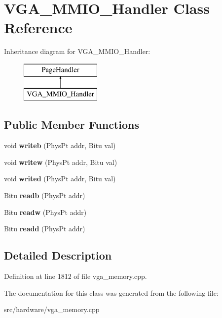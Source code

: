 \hypertarget{classVGA__MMIO__Handler}{\section{V\-G\-A\-\_\-\-M\-M\-I\-O\-\_\-\-Handler Class Reference}
\label{classVGA__MMIO__Handler}
}
Inheritance diagram for V\-G\-A\-\_\-\-M\-M\-I\-O\-\_\-\-Handler\-:\begin{figure}[H]
\begin{center}
\leavevmode
\includegraphics[height=2.000000cm]{classVGA__MMIO__Handler}
\end{center}
\end{figure}
\subsection*{Public Member Functions}
\begin{DoxyCompactItemize}
\item 
\hypertarget{classVGA__MMIO__Handler_a779662658a576ce1bd9aa3179e424495}{void {\bfseries writeb} (Phys\-Pt addr, Bitu val)}\label{classVGA__MMIO__Handler_a779662658a576ce1bd9aa3179e424495}

\item 
\hypertarget{classVGA__MMIO__Handler_a25ce81cdbb53959e45187ab1ac650cb2}{void {\bfseries writew} (Phys\-Pt addr, Bitu val)}\label{classVGA__MMIO__Handler_a25ce81cdbb53959e45187ab1ac650cb2}

\item 
\hypertarget{classVGA__MMIO__Handler_a60397669cf87d269153e5d1554cc16c4}{void {\bfseries writed} (Phys\-Pt addr, Bitu val)}\label{classVGA__MMIO__Handler_a60397669cf87d269153e5d1554cc16c4}

\item 
\hypertarget{classVGA__MMIO__Handler_aefab83f4a14d5626418aa371839e426f}{Bitu {\bfseries readb} (Phys\-Pt addr)}\label{classVGA__MMIO__Handler_aefab83f4a14d5626418aa371839e426f}

\item 
\hypertarget{classVGA__MMIO__Handler_a96360a3e09a8373dcb7a01266b3aa82e}{Bitu {\bfseries readw} (Phys\-Pt addr)}\label{classVGA__MMIO__Handler_a96360a3e09a8373dcb7a01266b3aa82e}

\item 
\hypertarget{classVGA__MMIO__Handler_a4fed3f110d17dda1ffb040a0e979f5cc}{Bitu {\bfseries readd} (Phys\-Pt addr)}\label{classVGA__MMIO__Handler_a4fed3f110d17dda1ffb040a0e979f5cc}

\end{DoxyCompactItemize}


\subsection{Detailed Description}


Definition at line 1812 of file vga\-\_\-memory.\-cpp.



The documentation for this class was generated from the following file\-:\begin{DoxyCompactItemize}
\item 
src/hardware/vga\-\_\-memory.\-cpp\end{DoxyCompactItemize}
